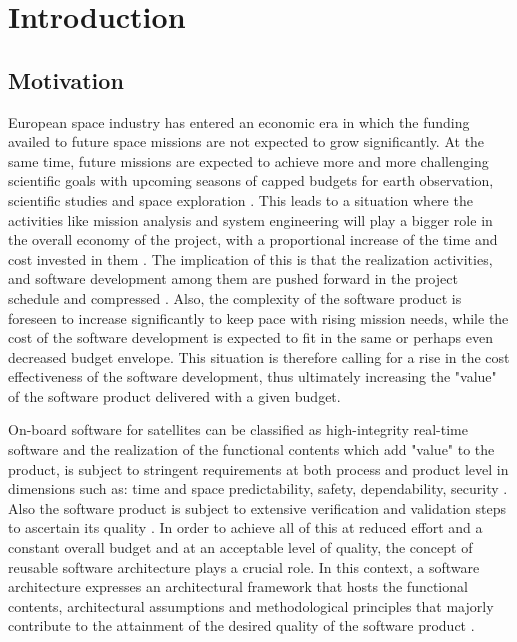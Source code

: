 
\chapter{Introduction}
\label{chap: Introduction}
\section{Motivation}
European space industry has entered an economic era in which the funding availed to future space missions are not expected to grow significantly. At the same time, future missions are expected to achieve more and more challenging scientific goals with upcoming seasons of capped budgets for earth observation, scientific studies and space exploration \cite{PhdThesis}. This leads to a situation where the activities like mission analysis and system engineering will play a bigger role in the overall economy of the project, with a proportional increase of the time and cost invested in them \cite{PhdThesis}. The implication of this is that the realization activities, and software development among them are pushed forward in the project schedule and compressed \cite{SAVOIR}. Also, the complexity of the software product is foreseen to increase significantly to keep pace with rising mission needs, while the cost of the software development is expected to fit in the same or perhaps even decreased budget envelope. This situation is therefore calling for a rise in the cost effectiveness of the software development, thus ultimately increasing the "value" of the software product delivered with a given budget.

On-board software for satellites can be classified as high-integrity real-time software and the realization of the functional contents which add "value" to the product, is subject to stringent requirements at both process and product level in dimensions such as: time and space predictability, safety, dependability, security \cite{PhdThesis}. Also the software product is subject to extensive verification and validation steps to ascertain its quality \cite{SAVOIR}. In order to achieve all of this at reduced effort and a constant overall budget and at an acceptable level of quality, the concept of reusable software architecture plays a crucial role. In this context, a software architecture expresses an architectural framework that hosts the functional contents, architectural assumptions and methodological principles that majorly contribute to the attainment of the desired quality of the software product \cite{PhdThesis}.

